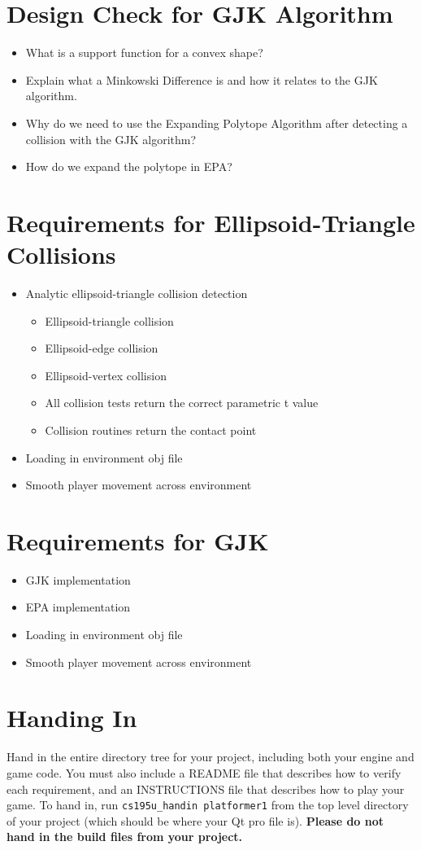 \documentclass{../cs195u}
\begin{document}
  \section*{Design Check for GJK Algorithm}
  \begin{itemize}
   \item What is a support function for a convex shape?
   \item Explain what a Minkowski Difference is and how it relates to the GJK algorithm.
   \item Why do we need to use the Expanding Polytope Algorithm after detecting a collision with the GJK algorithm?
   \item How do we expand the polytope in EPA?
  \end{itemize}

  \section*{Requirements for Ellipsoid-Triangle Collisions}
  \begin{itemize}
    \item Analytic ellipsoid-triangle collision detection
   \begin{itemize}
    \item Ellipsoid-triangle collision
    \item Ellipsoid-edge collision
    \item Ellipsoid-vertex collision
    \item All collision tests return the correct parametric t value
    \item Collision routines return the contact point
   \end{itemize}
   \item Loading in environment obj file
    \item Smooth player movement across environment
 \end{itemize}
 
 \section*{Requirements for GJK}
  \begin{itemize}
    \item GJK implementation
    \item EPA implementation
    \item Loading in environment obj file
    \item Smooth player movement across environment
   \end{itemize}

 \section*{Handing In}
Hand in the entire directory tree for your project, including both your engine and game code. You must also include a README file that describes how to verify each requirement, and an INSTRUCTIONS file that describes how to play your game. To hand in, run \texttt{cs195u\_handin platformer1} from the top level directory of your project (which should be where your Qt pro file is). \textbf{Please do not hand in the build files from your project.}
\end{document}
